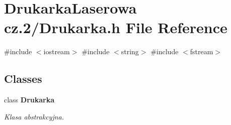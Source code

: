 \section{Drukarka\+Laserowa cz.2/\+Drukarka.h File Reference}
\label{_drukarka_8h}
{\ttfamily \#include $<$iostream$>$}\newline
{\ttfamily \#include $<$string$>$}\newline
{\ttfamily \#include $<$fstream$>$}\newline
\subsection*{Classes}
\begin{DoxyCompactItemize}
\item 
class \textbf{ Drukarka}
\begin{DoxyCompactList}\small\item\em Klasa abstrakcyjna. \end{DoxyCompactList}\end{DoxyCompactItemize}

